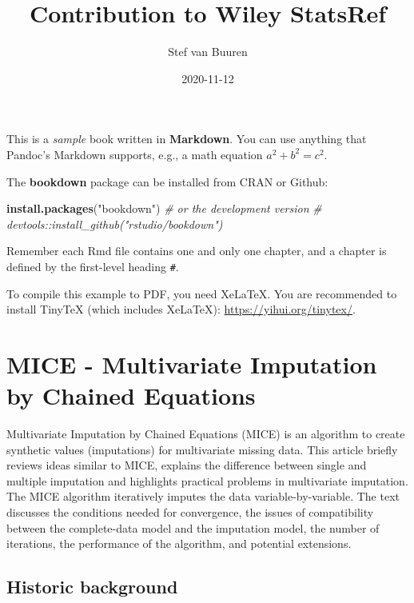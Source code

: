 \documentclass[
]{book}
\title{Contribution to Wiley StatsRef}
\author{Stef van Buuren}
\date{2020-11-12}
\newenvironment{Shaded}{\begin{snugshade}}{\end{snugshade}}
\newcommand{\CommentTok}[1]{\textcolor[rgb]{0.56,0.35,0.01}{\textit{#1}}}
\newcommand{\KeywordTok}[1]{\textcolor[rgb]{0.13,0.29,0.53}{\textbf{#1}}}
\newcommand{\NormalTok}[1]{#1}
\newcommand{\StringTok}[1]{\textcolor[rgb]{0.31,0.60,0.02}{#1}}
\begin{document}
\maketitle

{
\setcounter{tocdepth}{1}
\tableofcontents
}
This is a \emph{sample} book written in \textbf{Markdown}. You can use anything that Pandoc's Markdown supports, e.g., a math equation \(a^2 + b^2 = c^2\).

The \textbf{bookdown} package can be installed from CRAN or Github:

\begin{Shaded}
\begin{Highlighting}[]
\KeywordTok{install.packages}\NormalTok{(}\StringTok{"bookdown"}\NormalTok{)}
\CommentTok{# or the development version}
\CommentTok{# devtools::install_github("rstudio/bookdown")}
\end{Highlighting}
\end{Shaded}

Remember each Rmd file contains one and only one chapter, and a chapter is defined by the first-level heading \texttt{\#}.

To compile this example to PDF, you need XeLaTeX. You are recommended to install TinyTeX (which includes XeLaTeX): \url{https://yihui.org/tinytex/}.

\hypertarget{mice---multivariate-imputation-by-chained-equations}{%
\chapter{MICE - Multivariate Imputation by Chained Equations}\label{mice---multivariate-imputation-by-chained-equations}}

Multivariate Imputation by Chained Equations (MICE) is an algorithm to create synthetic values (imputations) for multivariate missing data. This article briefly reviews ideas similar to MICE, explains the difference between single and multiple imputation and highlights practical problems in multivariate imputation. The MICE algorithm iteratively imputes the data variable-by-variable. The text discusses the conditions needed for convergence, the issues of compatibility between the complete-data model and the imputation model, the number of iterations, the performance of the algorithm, and potential extensions.

\hypertarget{historic-background}{%
\section{Historic background}\label{historic-background}}
\end{document}
